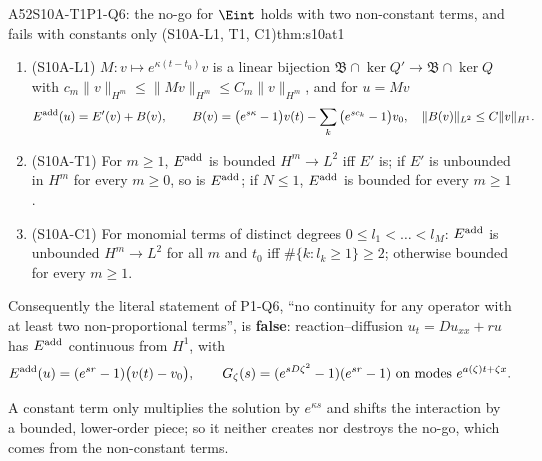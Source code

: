 \begin{dimcard}{A52}{S10A-T1}{P1-Q6: the no-go for $\Eint$ holds with two non-constant terms, and fails with constants only (S10A-L1, T1, C1)}{\proved}{thm:s10at1}
\begin{enumerate}[label=(\alph*)]
\item (S10A-L1) $M:v\mapsto e^{\kappa(t-t_0)}v$ is a linear bijection $\mathfrak B\cap\ker Q'\to\mathfrak B\cap\ker Q$ with $c_m\|v\|_{H^m}\le\|Mv\|_{H^m}\le C_m\|v\|_{H^m}$, and for $u=Mv$
\[
E^{\rm add}(u)=E'(v)+B(v),\qquad B(v)=\big(e^{s\kappa}-1\big)v(t)-\sum_k\big(e^{sc_k}-1\big)v_0,\quad \|B(v)\|_{L^2}\le C\|v\|_{H^1}.
\]
\item (S10A-T1) For $m\ge1$, $E^{\rm add}$ is bounded $H^m\to L^2$ iff $E'$ is; if $E'$ is unbounded in $H^m$ for every $m\ge0$, so is $E^{\rm add}$; if $N\le1$, $E^{\rm add}$ is bounded for every $m\ge1$.
\item (S10A-C1) For monomial terms of distinct degrees $0\le l_1<\dots<l_M$: $E^{\rm add}$ is unbounded $H^m\to L^2$ for all $m$ and $t_0$ iff $\#\{k:l_k\ge1\}\ge2$; otherwise bounded for every $m\ge1$.
\end{enumerate}
Consequently the literal statement of P1-Q6, ``no continuity for any operator with at least two non-proportional terms'', is \textbf{false}: reaction--diffusion $u_t=Du_{xx}+ru$ has $E^{\rm add}$ continuous from $H^1$, with
\[
E^{\rm add}(u)=(e^{sr}-1)\big(v(t)-v_0\big),\qquad G_\zeta(s)=(e^{sD\zeta^2}-1)(e^{sr}-1)\ \text{on modes }e^{a(\zeta)t+\zeta x}.
\]
\end{dimcard}

\begin{proofidea}
A constant term only multiplies the solution by $e^{\kappa s}$ and shifts the interaction by a bounded, lower-order piece; so it neither creates nor destroys the no-go, which comes from the non-constant terms.
\end{proofidea}

